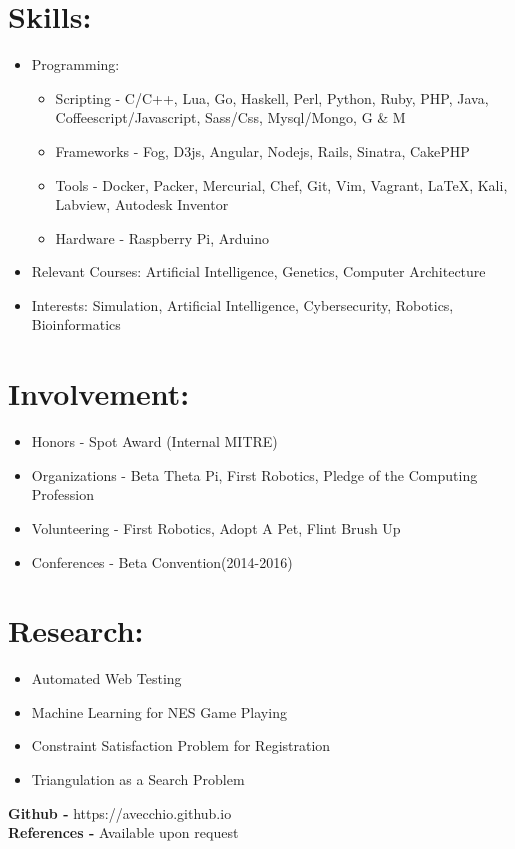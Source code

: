 \documentclass{res}
\begin{document}
\section{Skills:}
\begin{itemize}
\item Programming:
\begin{itemize}[label=$\circ$]
\item Scripting - C/C++, Lua, Go, Haskell, Perl, Python, Ruby, PHP, Java, Coffeescript/Javascript, Sass/Css, Mysql/Mongo, G \& M
\item Frameworks - Fog, D3js, Angular, Nodejs, Rails, Sinatra, CakePHP
\item Tools - Docker, Packer, Mercurial, Chef, Git, Vim, Vagrant, \LaTeX, Kali, Labview, Autodesk Inventor
\item Hardware - Raspberry Pi, Arduino
\end{itemize}
\item Relevant Courses: Artificial Intelligence, Genetics, Computer Architecture
\item Interests: Simulation, Artificial Intelligence, Cybersecurity, Robotics, Bioinformatics
\end{itemize}

\section{Involvement:}
\begin{itemize}
\item Honors - Spot Award (Internal MITRE)
\item Organizations - Beta Theta Pi, First Robotics, Pledge of the Computing Profession
\item Volunteering - First Robotics, Adopt A Pet, Flint Brush Up
\item Conferences - Beta Convention(2014-2016)%
\end{itemize}

\section{Research:}
\begin{itemize}
\item Automated Web Testing
\item Machine Learning for NES Game Playing
\item Constraint Satisfaction Problem for Registration
\item Triangulation as a Search Problem
\end{itemize}

\begin{center}
\textbf{Github - }https://avecchio.github.io\\
\textbf{References - }Available upon request
\end{center}
\end{document}
